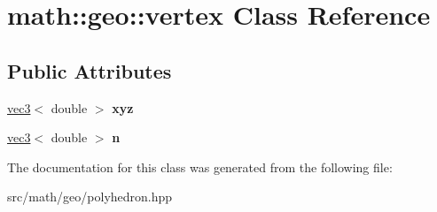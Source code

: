 \hypertarget{classmath_1_1geo_1_1vertex}{
\section{math::geo::vertex Class Reference}
\label{classmath_1_1geo_1_1vertex}
}
\subsection*{Public Attributes}
\begin{DoxyCompactItemize}
\item 
\hypertarget{classmath_1_1geo_1_1vertex_a3cfea2f74fcc452adb1adf0ffdb2ca7f}{
\hyperlink{classmath_1_1vec3}{vec3}$<$ double $>$ {\bfseries xyz}}
\label{classmath_1_1geo_1_1vertex_a3cfea2f74fcc452adb1adf0ffdb2ca7f}

\item 
\hypertarget{classmath_1_1geo_1_1vertex_ad89b7cb642fbf1332c05cd2534d02475}{
\hyperlink{classmath_1_1vec3}{vec3}$<$ double $>$ {\bfseries n}}
\label{classmath_1_1geo_1_1vertex_ad89b7cb642fbf1332c05cd2534d02475}

\end{DoxyCompactItemize}


The documentation for this class was generated from the following file:\begin{DoxyCompactItemize}
\item 
src/math/geo/polyhedron.hpp\end{DoxyCompactItemize}
